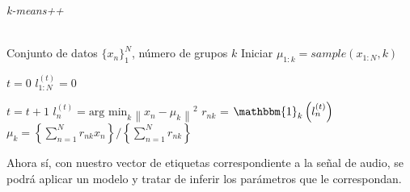 \begin{algorithm}[tp]
   \caption{\textit{k-means++}}
   \label{alg:kmeanspp}
\begin{algorithmic}
    \\ Conjunto de datos $\lbrace x_n \rbrace_1^N $, número de grupos $k$
   \STATE Iniciar $\mu_{1:k} = sample(x_{1:N}, k)$   
   
   \STATE $t = 0$
   \STATE $l_{1:N}^{(t)} = 0$
      
   \REPEAT  
   \STATE $t=t+1$ 
   \STATE $l_n^{(t)} = \text{arg min}_k {\left \| x_n - \mu_k \right \|}^2 $
   \STATE $r_{nk}$ = $\mathbbm{1}_k\left(l_n^{(t)}\right)$
   \STATE $\mu_k = \left\lbrace {\sum_{n=1}^N r_{nk} x_n} \right\rbrace / \left\lbrace {\sum_{n=1}^N r_{nk}} \right\rbrace $
\end{algorithmic}
\end{algorithm}

Ahora sí, con nuestro vector de etiquetas correspondiente a la señal de audio, se podrá aplicar un modelo y tratar de inferir los parámetros que le correspondan.


